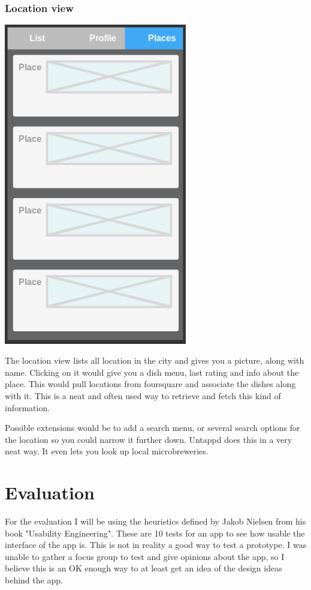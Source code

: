 \documentclass[12pt]{article}
\begin{document}
\subsubsection{Location view}
\includegraphics[width=8cm]{pictures/prototype/places}
\bigbreak

The location view lists all location in the city and gives you a picture, along
with name. Clicking on it would give you a dish menu, last rating and info about
the place. This would pull locations from foursquare and associate the dishes
along with it. This is a neat and often used way to retrieve and fetch this kind
of information.

Possible extensions would be to add a search menu, or several search options for
the location so you could narrow it further down. Untappd does this in a very
neat way. It even lets you look up local microbreweries.


\section{Evaluation}

For the evaluation I will be using the heuristics defined by Jakob Nielsen from
his book "Usability Engineering"\cite{usability}. These are 10 tests for an app to see how
usable the interface of the app is. This is not in reality a good way to test a
prototype. I was unable to gather a focus group to test and give opinions about
the app, so I believe this is an OK enough way to at least get an idea of the
design ideas behind the app.
\end{document}
